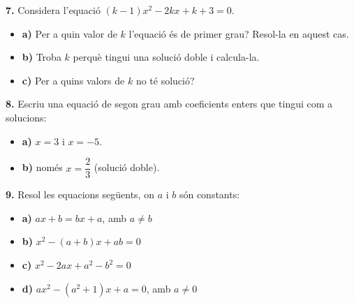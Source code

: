 \documentclass[13pt,a4paper]{extarticle}
\begin{document}
\par\noindent\begin{minipage}{\linewidth}
\textbf{7.} Considera l'equació $(k-1)x^2-2kx+k+3=0$.\par

\begin{itemize}[leftmargin=0pt,itemsep=6pt,topsep=4pt,parsep=0pt,label={}]
\item \textbf{a)} Per a quin valor de $k$ l'equació és de primer grau? Resol-la en aquest cas.
\item \textbf{b)} Troba $k$ perquè tingui una solució doble i calcula-la.
\item \textbf{c)} Per a quins valors de $k$ no té solució?
\end{itemize}
\end{minipage}\par\vspace{1.6mm}
\par\noindent\begin{minipage}{\linewidth}
\textbf{8.} Escriu una equació de segon grau amb coeficients enters que tingui com a solucions:\par

\begin{itemize}[leftmargin=0pt,itemsep=6pt,topsep=4pt,parsep=0pt,label={}]
\item \textbf{a)} $x=3$ i $x=-5$.
\item \textbf{b)} només $x=\dfrac23$ (solució doble).
\end{itemize}
\end{minipage}\par\vspace{1.6mm}
\par\noindent\begin{minipage}{\linewidth}
\textbf{9.} Resol les equacions següents, on $a$ i $b$ són constants:\par

\begin{itemize}[leftmargin=0pt,itemsep=6pt,topsep=4pt,parsep=0pt,label={}]
\item \textbf{a)} $ax+b=bx+a$, amb $a\neq b$
\item \textbf{b)} $x^2-(a+b)x+ab=0$
\item \textbf{c)} $x^2-2ax+a^2-b^2=0$
\item \textbf{d)} $ax^2-(a^2+1)x+a=0$, amb $a\neq0$
\end{itemize}
\end{minipage}\par\vspace{1.6mm}
\end{document}
